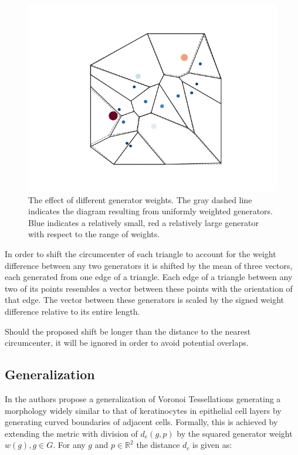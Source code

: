 \documentclass[a4paper]{article}
\begin{document}
\begin{figure}[H]
	\includegraphics[width=\textwidth]{generator_weights.png}
	\caption{The effect of different generator weights. The gray dashed line indicates the diagram resulting from
		uniformly weighted generators. Blue indicates a relatively small, red a relatively large generator with respect
		to the range of weights.}
\end{figure}

In order to shift the circumcenter of each triangle to account for the weight difference between any two generators
it is shifted by the mean of three vectors, each generated from one edge of a triangle.
Each edge of a triangle between any two  of its points resembles a vector between these points with the orientation
of that edge. The vector between these generators is scaled by the signed weight difference relative to its entire length.

Should the proposed shift be longer than the distance to the nearest circumcenter, it will be ignored
in order to avoid potential overlaps.

\subsection{Generalization}
In \cite{Bock2010} the authors propose a generalization of Voronoi Tessellations generating a morphology
widely similar to that of keratinocytes in epithelial cell layers by generating curved boundaries of adjacent cells.
Formally, this is achieved by extending the metric with division of \(d_e(g, p)\) by the squared generator weight
\(w(g), g \in G\). For any \(g\) and \(p \in \mathbb{R}^2\) the distance \(d_c\) is given as:
\end{document}
